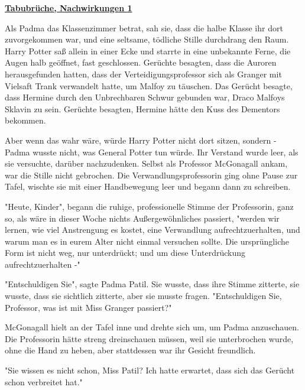 

\hypertarget{tabubruxfcche-nachwirkungen-1}{%

\textbf{\uline{Tabubrüche, Nachwirkungen 1}}

Als Padma das Klassenzimmer betrat, sah sie, dass die halbe Klasse ihr dort zuvorgekommen war, und eine seltsame, tödliche Stille durchdrang den Raum. Harry Potter saß allein in einer Ecke und starrte in eine unbekannte Ferne, die Augen halb geöffnet, fast geschlossen. Gerüchte besagten, dass die Auroren herausgefunden hatten, dass der Verteidigungsprofessor sich als Granger mit Vielsaft Trank verwandelt hatte, um Malfoy zu täuschen. Das Gerücht besagte, dass Hermine durch den Unbrechbaren Schwur gebunden war, Draco Malfoys Sklavin zu sein. Gerüchte besagten, Hermine hätte den Kuss des Dementors bekommen.

Aber wenn das wahr wäre, würde Harry Potter nicht dort sitzen, sondern - Padma wusste nicht, was General Potter tun würde. Ihr Verstand wurde leer, als sie versuchte, darüber nachzudenken. Selbst als Professor McGonagall ankam, war die Stille nicht gebrochen. Die Verwandlungsprofessorin ging ohne Pause zur Tafel, wischte sie mit einer Handbewegung leer und begann dann zu schreiben.

"Heute, Kinder", begann die ruhige, professionelle Stimme der Professorin, ganz so, als wäre in dieser Woche nichts Außergewöhnliches passiert, "werden wir lernen, wie viel Anstrengung es kostet, eine Verwandlung aufrechtzuerhalten, und warum man es in eurem Alter nicht einmal versuchen sollte. Die ursprüngliche Form ist nicht weg, nur unterdrückt; und um diese Unterdrückung aufrechtzuerhalten -"

"Entschuldigen Sie", sagte Padma Patil. Sie wusste, dass ihre Stimme zitterte, sie wusste, dass sie sichtlich zitterte, aber sie musste fragen. "Entschuldigen Sie, Professor, was ist mit Miss Granger passiert?"

McGonagall hielt an der Tafel inne und drehte sich um, um Padma anzuschauen. Die Professorin hätte streng dreinschauen müssen, weil sie unterbrochen wurde, ohne die Hand zu heben, aber stattdessen war ihr Gesicht freundlich.

"Sie wissen es nicht schon, Miss Patil? Ich hatte erwartet, dass sich das Gerücht schon verbreitet hat."

}
